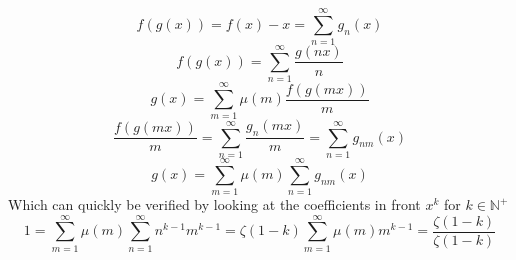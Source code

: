 \documentclass[a4paper]{article}
\begin{document}
$$f(g(x)) = f(x) - x = \sum_{n=1}^{\infty} g_n(x)$$
$$f(g(x)) = \sum_{n=1}^{\infty} \frac{g(n x)}{n}$$
$$g(x) = \sum_{m=1}^{\infty} \mu(m) \frac{f(g(m x))}{m}$$
$$\frac{f(g(m x))}{m} = \sum_{n=1}^{\infty} \frac{g_n(m x)}{m} = \sum_{n=1}^{\infty} g_{n m}(x)$$
$$g(x) = \sum_{m=1}^{\infty} \mu(m) \sum_{n=1}^{\infty} g_{n m}(x)$$
Which can quickly be verified by looking at the coefficients in front $x^k$ for $k \in \mathbb{N}^+$
$$1 = \sum_{m=1}^{\infty} \mu(m) \sum_{n=1}^{\infty} n^{k-1} m^{k-1} = \zeta(1-k) \sum_{m=1}^{\infty} \mu(m) m^{k-1} = \frac{\zeta(1-k)}{\zeta(1-k)}$$
\end{document}
